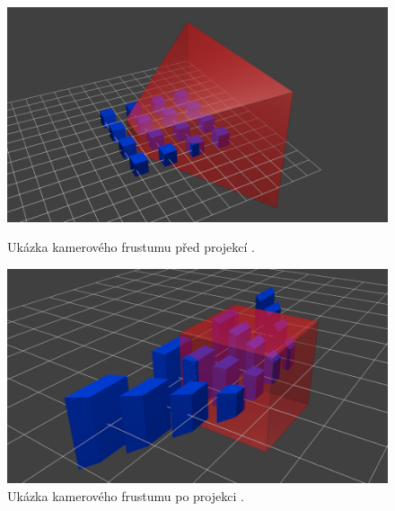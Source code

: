 \documentclass[czech,bachelor,dept420,male,cpdeclaration]{diploma}
\begin{document}
\begin{figure}[H]
    \centering
    \begin{minipage}[c]{0.48\linewidth}        %
        \centering
        \includegraphics[width=\linewidth]{Figures/projectionMatrixCameraFrustum1.png}
        \caption{Ukázka kamerového frustumu před projekcí \cite{tutorial3matrices}.} %
        \label{fig:projectionMatrixCameraFrustum1}
    \end{minipage}
    \begin{minipage}[c]{0.48\linewidth}        %
        \centering
        \includegraphics[width=\linewidth]{Figures/projectionMatrixCameraFrustum2.png}
        \caption{Ukázka kamerového frustumu po projekci \cite{tutorial3matrices}.}
        \label{fig:projectionMatrixCameraFrustum2}
    \end{minipage}
\end{figure}
\end{document}
